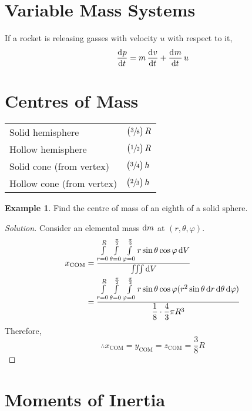 \documentclass[fleqn, a5paper]{amsart}
\theoremstyle{definition}
\newtheorem{example}{Example}
\theoremstyle{theorem}
\newenvironment{solution}
{\begin{proof}[Solution]\let\qed\relax}
	{\end{proof}}
\begin{document}
\section{Variable Mass Systems}

If a rocket is releasing gasses with velocity $u$ with respect to it,
\begin{equation*}
\dod{p}{t} = m \dod{v}{t} + \dod{m}{t} u
\end{equation*}

\section{Centres of Mass}

\begin{tabular}{l l}
	Solid hemisphere & $\left( \sfrac{3}{8} \right) R$\\
	Hollow hemisphere & $\left( \sfrac{1}{2} \right) R$\\
	Solid cone (from vertex) & $\left( \sfrac{3}{4} \right) h$\\
	Hollow cone (from vertex) & $\left( \sfrac{2}{3} \right) h$\\
\end{tabular}

\begin{example}
	Find the centre of mass of an eighth of a solid sphere.
\end{example}

\begin{solution}
	Consider an elemental mass $\dif m$ at $(r, \theta, \varphi)$.
	\begin{align*}
		x_{\text{COM}} &= \dfrac{\int\limits_{r = 0}^{R} \int\limits_{\theta = 0}^{\frac{\pi}{2}} \int\limits_{\varphi = 0}^{\frac{\pi}{2}} r \sin \theta \cos \varphi \dif V}{\iiint \dif V}\\
		&= \dfrac{\int\limits_{r = 0}^{R} \int\limits_{\theta = 0}^{\frac{\pi}{2}} \int\limits_{\varphi = 0}^{\frac{\pi}{2}} r \sin \theta \cos \varphi (r^2 \sin \theta \dif r \dif \theta \dif \varphi)}{\dfrac{1}{8} \cdot \dfrac{4}{3} \pi R^3}
	\end{align*}
	Therefore,
	\begin{equation*}
		\therefore x_{\text{COM}} = y_{\text{COM}} = z_{\text{COM}} = \dfrac{3}{8} R
	\end{equation*}
\end{solution}

\section{Moments of Inertia}
\end{document}
